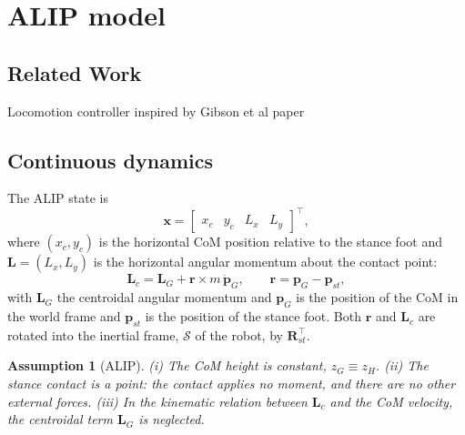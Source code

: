 \documentclass[11pt]{article}
\newtheorem{assumption}{Assumption}
\theoremstyle{remark}
\theoremstyle{definition}
\newcommand{\x}{\bm{x}}
\newcommand{\p}{\bm{p}}
\newcommand{\Rot}{\bm{R}}
\begin{document}
\section{ALIP model}\label{sec:alip}
\subsection{Related Work}
Locomotion controller inspired by Gibson et al paper \cite{gibson_terrain-adaptive_2022}

\subsection{Continuous dynamics}
The ALIP state is
\begin{equation}
  \x=\begin{bmatrix}x_c & y_c & L_x & L_y\end{bmatrix}^\top,
\end{equation}
where $(x_c,y_c)$ is the horizontal CoM position relative to the stance foot and
$\bm L=(L_x,L_y)$ is the horizontal angular momentum about the contact point:
\begin{equation}
  \bm L_{c}=\bm L_{G}+\bm r\times m\,\bm \dot{\p}_{G},\qquad \bm r=\p_{G}-\p_{st},
  \label{eq:Lcontact}
\end{equation}
with $\bm L_G$ the centroidal angular momentum and $\bm p_G$ is the position of the CoM in the world frame and $\bm p_{st}$ is the position of the stance foot. Both $\bm r$ and $\bm L_c$
are rotated into the inertial frame, $\mathcal S$ of the robot, by $\Rot_{st}^\top$.

\begin{assumption}[ALIP]\label{as:alip}
(i) The CoM height is constant, $z_G\equiv z_H$. (ii) The stance contact is a point: the
contact applies no moment, and there are no other external forces. (iii) In the kinematic relation between
$\bm L_c$ and the CoM velocity, the centroidal term $\bm L_G$ is neglected.
\end{assumption}
\end{document}
